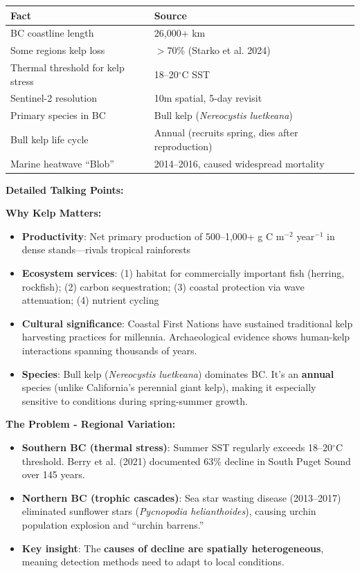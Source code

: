 \documentclass[11pt]{article}
\begin{document}
\begin{center}
\begin{tabular}{ll}
\toprule
\textbf{Fact} & \textbf{Source} \\
\midrule
BC coastline length & 26,000+ km \\
Some regions kelp loss & $>$70\% (Starko et al. 2024) \\
Thermal threshold for kelp stress & 18--20$^\circ$C SST \\
Sentinel-2 resolution & 10m spatial, 5-day revisit \\
Primary species in BC & Bull kelp (\textit{Nereocystis luetkeana}) \\
Bull kelp life cycle & Annual (recruits spring, dies after reproduction) \\
Marine heatwave ``Blob'' & 2014--2016, caused widespread mortality \\
\bottomrule
\end{tabular}
\end{center}

\textbf{Detailed Talking Points:}

\textbf{Why Kelp Matters:}
\begin{itemize}
    \item \textbf{Productivity}: Net primary production of 500--1,000+ g C m$^{-2}$ year$^{-1}$ in dense stands---rivals tropical rainforests
    \item \textbf{Ecosystem services}: (1) habitat for commercially important fish (herring, rockfish); (2) carbon sequestration; (3) coastal protection via wave attenuation; (4) nutrient cycling
    \item \textbf{Cultural significance}: Coastal First Nations have sustained traditional kelp harvesting practices for millennia. Archaeological evidence shows human-kelp interactions spanning thousands of years.
    \item \textbf{Species}: Bull kelp (\textit{Nereocystis luetkeana}) dominates BC. It's an \textbf{annual} species (unlike California's perennial giant kelp), making it especially sensitive to conditions during spring-summer growth.
\end{itemize}

\textbf{The Problem - Regional Variation:}
\begin{itemize}
    \item \textbf{Southern BC (thermal stress)}: Summer SST regularly exceeds 18--20$^\circ$C threshold. Berry et al. (2021) documented 63\% decline in South Puget Sound over 145 years.
    \item \textbf{Northern BC (trophic cascades)}: Sea star wasting disease (2013--2017) eliminated sunflower stars (\textit{Pycnopodia helianthoides}), causing urchin population explosion and ``urchin barrens.''
    \item \textbf{Key insight}: The \textbf{causes of decline are spatially heterogeneous}, meaning detection methods need to adapt to local conditions.
\end{itemize}
\end{document}
